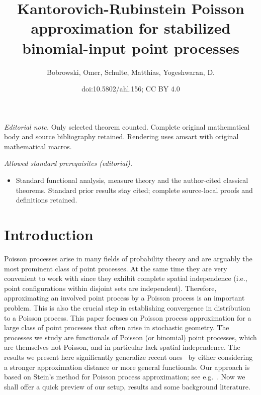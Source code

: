 \documentclass[10pt]{amsart}
\title{Kantorovich-Rubinstein Poisson approximation for stabilized binomial-input point processes}
\author{Bobrowski, Omer, Schulte, Matthias, Yogeshwaran, D.}
\date{doi:10.5802/ahl.156; CC BY 4.0}
\theoremstyle{definition}\newtheorem{defi}[theo]{Definition}\newtheorem{rema}[theo]{Remark}\newtheorem{exam}[theo]{Example}\newtheorem{exem}[theo]{Example}\newtheorem{nota}[theo]{Notation}
\begin{document}
\maketitle
\noindent\textit{Editorial note.} Only selected theorem counted. Complete original mathematical body and source bibliography retained. Rendering uses amsart with original mathematical macros.\par\medskip
\noindent\textit{Allowed standard prerequisites (editorial).}\begin{itemize}
\item Standard functional analysis, measure theory and the author-cited classical theorems. Standard prior results stay cited; complete source-local proofs and definitions retained.
\end{itemize}\medskip


\section{Introduction}

Poisson processes arise in many fields of probability theory and are arguably the most prominent class of point processes. At the same time they are very convenient to work with since they exhibit complete spatial independence (i.e., point configurations within disjoint sets are independent). Therefore, approximating an involved point process by a Poisson process is an important problem. This is also the crucial step in establishing convergence in distribution to a Poisson process. This paper focuses on Poisson process approximation for a large class of point processes that often arise in stochastic geometry. The processes we study are functionals of Poisson (or binomial) point processes, which are themselves not Poisson, and in particular lack spatial independence. The results we present here significantly generalize recent ones~\cite{decreusefond_functional_2016,Otto2020} by either considering a stronger approximation distance or more general functionals. Our approach is based on Stein's method for Poisson process approximation; see e.g.~\cite{Barbour1988,Barbour1992,Barbour1992book,Chen2004,decreusefond_functional_2016, Xia2005}. Now we shall offer a quick preview of our setup, results and some background literature.
\end{document}
